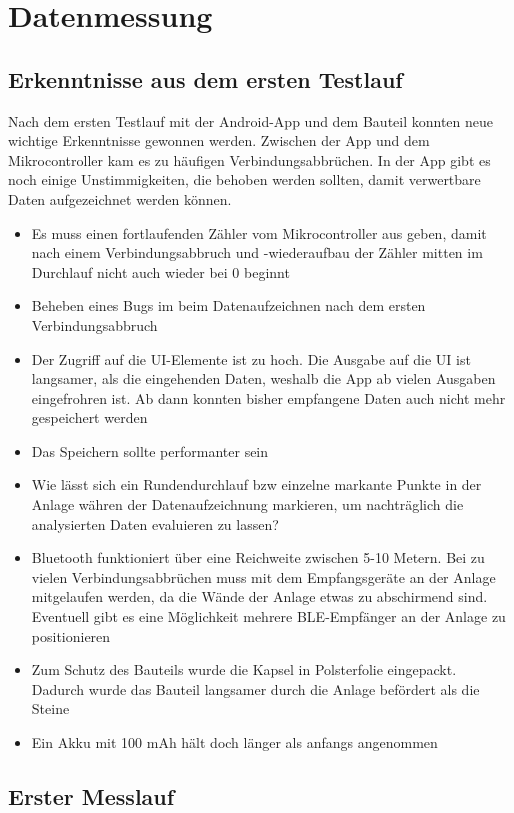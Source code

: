 \section{Datenmessung}

\subsection{Erkenntnisse aus dem ersten Testlauf}
Nach dem ersten Testlauf mit der Android-App und dem Bauteil konnten neue wichtige Erkenntnisse gewonnen werden.
Zwischen der App und dem Mikrocontroller kam es zu häufigen Verbindungsabbrüchen. In der App gibt es noch einige Unstimmigkeiten, die behoben werden sollten, damit verwertbare Daten aufgezeichnet werden können. 

\begin{itemize}
	\item Es muss einen fortlaufenden Zähler vom Mikrocontroller aus geben, damit nach einem Verbindungsabbruch und -wiederaufbau der Zähler mitten im Durchlauf nicht auch wieder bei 0 beginnt
	\item Beheben eines Bugs im beim Datenaufzeichnen nach dem ersten Verbindungsabbruch
	\item Der Zugriff auf die UI-Elemente ist zu hoch. Die Ausgabe auf die UI ist langsamer, als die eingehenden Daten, weshalb die App ab vielen Ausgaben eingefrohren ist. Ab dann konnten bisher empfangene Daten auch nicht mehr gespeichert werden
	\item Das Speichern sollte performanter sein
	\item Wie lässt sich ein Rundendurchlauf bzw einzelne markante Punkte in der Anlage währen der Datenaufzeichnung markieren, um nachträglich die analysierten Daten evaluieren zu lassen?
	\item Bluetooth funktioniert über eine Reichweite zwischen 5-10 Metern. Bei zu vielen Verbindungsabbrüchen muss mit dem Empfangsgeräte an der Anlage mitgelaufen werden, da die Wände der Anlage etwas zu abschirmend sind. Eventuell gibt es eine Möglichkeit mehrere BLE-Empfänger an der Anlage zu positionieren
	\item Zum Schutz des Bauteils wurde die Kapsel in Polsterfolie eingepackt. Dadurch wurde das Bauteil langsamer durch die Anlage befördert als die Steine
	\item Ein Akku mit 100 mAh hält doch länger als anfangs angenommen
\end{itemize}

\subsection{Erster Messlauf}

